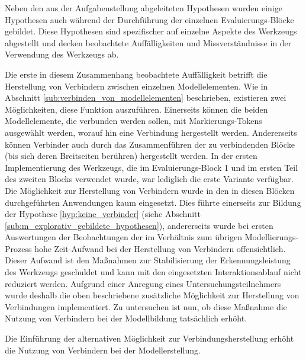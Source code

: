 Neben den aus der Aufgabenstellung abgeleiteten Hypothesen wurden einige Hypothesen auch während der Durchführung der einzelnen Evaluierungs-Blöcke gebildet. Diese Hypothesen sind spezifischer auf einzelne Aspekte des Werkzeugs abgestellt und decken beobachtete Auffälligkeiten und Missverständnisse in der Verwendung des Werkzeugs ab. 

Die erste in diesem Zusammenhang beobachtete Auffälligkeit betrifft die Herstellung von Verbindern zwischen einzelnen Modellelementen. Wie in Abschnitt \ref{sub:verbinden_von_modellelementen} beschrieben, existieren zwei Möglichkeiten, diese Funktion auszuführen. Einerseits können die beiden Modellelemente, die verbunden werden sollen, mit Markierungs-Tokens ausgewählt werden, worauf hin eine Verbindung hergestellt werden. Andererseits können Verbinder auch durch das Zusammenführen der zu verbindenden Blöcke (bis sich deren Breitseiten berühren) hergestellt werden. In der ersten Implementierung des Werkzeugs, die im Evaluierungs-Block 1 und im ersten Teil des zweiten Blocks verwendet wurde, war lediglich die erste Variante verfügbar. Die Möglichkeit zur Herstellung von Verbindern wurde in den in diesen Blöcken durchgeführten Anwendungen kaum eingesetzt. Dies führte einerseits zur Bildung der Hypothese \ref{hyp:keine_verbinder} (siehe Abschnitt \ref{sub:m_explorativ_gebildete_hypothesen}), andererseits wurde bei ersten Auswertungen der Beobachtungen der im Verhältnis zum übrigen Modellierungs-Prozess hohe Zeit-Aufwand bei der Herstellung von Verbindern offensichtlich. Dieser Aufwand ist den Maßnahmen zur Stabilisierung der Erkennungsleistung des Werkzeugs geschuldet und kann mit den eingesetzten Interaktionsablauf nicht reduziert werden. Aufgrund einer Anregung eines Untersuchungsteilnehmers wurde deshalb die oben beschriebene zusätzliche Möglichkeit zur Herstellung von Verbindungen implementiert. Zu untersuchen ist nun, ob diese Maßnahme die Nutzung von Verbindern bei der Modellbildung tatsächlich erhöht.

\begin{hyp}
	\label{hyp:verbinder}
	Die Einführung der alternativen Möglichkeit zur Verbindungsherstellung erhöht die Nutzung von Verbindern bei der Modellerstellung.
\end{hyp}

